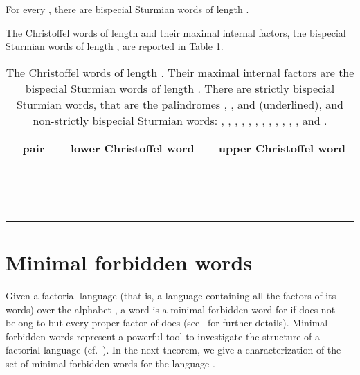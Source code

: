\documentclass{llncs}
\begin{document}
\begin{corollary}\label{cor:formula}
 For every , there are  bispecial Sturmian words of length .
\end{corollary}

\begin{example}
The Christoffel words of length  and their maximal internal factors, the bispecial Sturmian words of length , are reported in Table \ref{tab:example}. 

\begin{table}[h]
\begin{center}
  \begin{tabular}{|c | c | c | }
  
\ pair  \ & \ lower Christoffel word  \ & \ upper Christoffel word  \  \\    \hline 
  &       &         \\
  &       &       \\
   &       &        \\
   &       &        \\
   &       &        \\
   &       &     \\
   &       &        \\
   &       &       \\
   &       &        \\
  &       &        \\
  &       &        \\    
 \hline 
  \end{tabular}\vspace{4mm}
\end{center}\caption{The Christoffel words of length . Their maximal internal factors are the bispecial Sturmian words of length . There are  strictly bispecial Sturmian words, that are the palindromes , ,  and  (underlined), and  non-strictly bispecial Sturmian words: , , , , , , , , , , , ,  and  .\label{tab:example}}
\end{table}
\end{example}

\section{Minimal forbidden words}\label{sec:MF}


Given a factorial language  (that is, a language containing all the factors of its words) over the alphabet , a word  is a minimal forbidden word for  if  does not belong to  but every proper factor of  does (see~\cite{CrMiRe98} for further details). Minimal forbidden words represent a powerful tool to investigate the structure of a factorial language (cf.~\cite{BeMiRe96}). In the next theorem, we give a characterization of the set  of minimal forbidden words for the language . 
\end{document}
